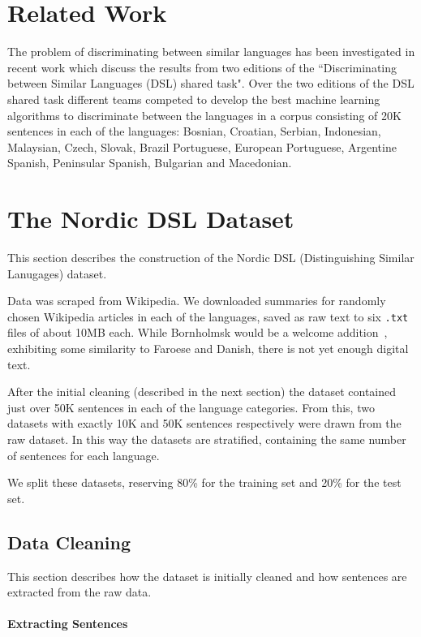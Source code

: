 \documentclass[11pt,a4paper]{article}
\begin{document}
 \section{Related Work}

The problem of discriminating between similar languages has been investigated in recent work \cite{DSLEvaluation,DSL2015} which discuss the results from two editions of the ``Discriminating between Similar Languages (DSL) shared task". Over the two editions of the DSL shared task different teams competed to develop the best machine learning algorithms to discriminate between the languages in a corpus consisting of 20K sentences in each of the languages: Bosnian, Croatian, Serbian, Indonesian, Malaysian, Czech, Slovak, Brazil Portuguese, European Portuguese, Argentine Spanish, Peninsular Spanish, Bulgarian and Macedonian.
 
\section{The Nordic DSL Dataset}
This section describes the construction of the Nordic DSL (Distinguishing Similar Lanugages) dataset.

Data was scraped from Wikipedia. We  downloaded summaries for randomly chosen Wikipedia articles in each of the languages, saved as raw text to six {\tt .txt} files of about 10MB each. While Bornholmsk would be a welcome addition~\cite{derczynski2019bornholmsk}, exhibiting some similarity to Faroese and Danish, there is not yet enough digital text.

After the initial cleaning (described in the next section) the dataset contained just over 50K sentences in each of the language categories. From this, two datasets with exactly 10K and 50K sentences respectively were drawn from the raw dataset. In this way the datasets are stratified, containing the same number of sentences for each language.

We split these datasets, reserving 80\% for the training set and 20\% for the test set.

\subsection{Data Cleaning}
This section describes how the dataset is initially cleaned and how sentences are extracted from the raw data.

\paragraph{Extracting Sentences}
\end{document}

